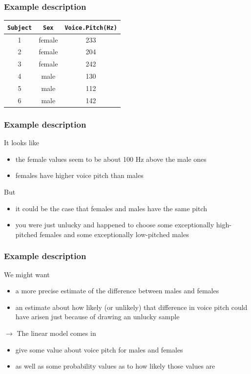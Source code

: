 \documentclass{beamer}\usepackage[]{graphicx}\usepackage[]{color}
\begin{document}
\begin{frame}
\frametitle{Example description}

\begin{center}
\begin{tabular}{ccc}
\toprule
\texttt{Subject} & \texttt{Sex} & \texttt{Voice.Pitch(Hz)} \\
\midrule
1 & female & 233 \\
2 & female & 204 \\
3 & female & 242 \\
4 & male & 130 \\
5 & male & 112 \\
6 & male & 142 \\
\bottomrule
\end{tabular}
\end{center}

\end{frame}

\begin{frame}
\frametitle{Example description}
It looks like
\begin{itemize}
\item the female values seem to be about 100 Hz above the male ones
\item females have higher voice pitch than males
\end{itemize}

\vspace{9pt}
But
\begin{itemize}
\item it could be the case that females and males have the same pitch
\item you were just unlucky and happened to choose some exceptionally high-pitched females and some exceptionally low-pitched males
\end{itemize}
\end{frame}

\begin{frame}
\frametitle{Example description}
We might want
\begin{itemize}
\item a more precise estimate of the difference between males and females
\item an estimate about how likely (or unlikely) that difference in voice pitch could have arisen just because of drawing an unlucky sample
\end{itemize}

$\rightarrow$ \alert{The linear model} comes in
\begin{itemize}
\item give some value about voice pitch for males and females
\item as well as \alert{some probability values} as to how likely those values are
\end{itemize}
\end{frame}
\end{document}
